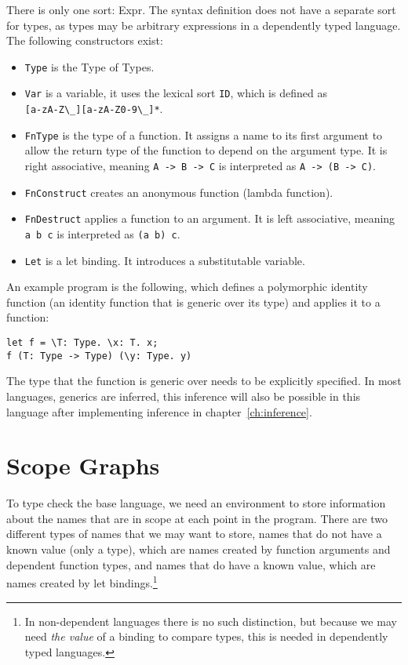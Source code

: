 There is only one sort: Expr. The syntax definition does not have a separate sort for types, as types may be arbitrary expressions in a dependently typed language. The following constructors exist:
\begin{itemize}
	\item \verb|Type| is the Type of Types.
	\item \verb|Var| is a variable, it uses the lexical sort \verb|ID|, which is defined as \\ \verb|[a-zA-Z\_][a-zA-Z0-9\_]*|.
	\item \verb|FnType| is the type of a function. It assigns a name to its first argument to allow the return type of the function to depend on the argument type. It is right associative, meaning \verb|A -> B -> C| is interpreted as \verb|A -> (B -> C)|. 
	\item \verb|FnConstruct| creates an anonymous function (lambda function).
	\item \verb|FnDestruct| applies a function to an argument. It is left associative, meaning \verb|a b c| is interpreted as \verb|(a b) c|.
	\item \verb|Let| is a let binding. It introduces a substitutable variable.
\end{itemize}

An example program is the following, which defines a polymorphic identity function (an identity function that is generic over its type) and applies it to a function:

\begin{lstlisting}
let f = \T: Type. \x: T. x;
f (T: Type -> Type) (\y: Type. y)
\end{lstlisting}

The type that the function is generic over needs to be explicitly specified. In most languages, generics are inferred, this inference will also be possible in this language after implementing inference in chapter~\ref{ch:inference}.

\section{Scope Graphs}
\label{sec:coc-scopes}

To type check the base language, we need an environment to store information about the names that are in scope at each point in the program. There are two different types of names that we may want to store, names that do not have a known value (only a type), which are names created by function arguments and dependent function types, and names that do have a known value, which are names created by let bindings.\footnote{In non-dependent languages there is no such distinction, but because we may need \emph{the value} of a binding to compare types, this is needed in dependently typed languages.}

